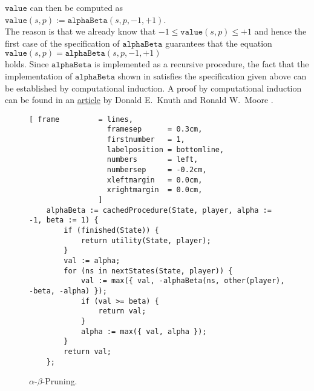 $\texttt{value}$ can then be computed as 
\\[0.2cm]
\hspace*{1.3cm}
$\texttt{value}(s, p ) := \texttt{alphaBeta}(s, p, -1, +1)$.
\\[0.2cm]
The reason is that we already know that $-1 \leq \texttt{value}(s,p) \leq +1$ and hence the first case of the
specification of $\texttt{alphaBeta}$ guarantees that the equation
\\[0.2cm]
\hspace*{1.3cm}
$\texttt{value}(s,p) = \texttt{alphaBeta}(s,p,-1,+1)$
\\[0.2cm]
holds.  Since $\texttt{alphaBeta}$ is implemented as a recursive procedure, 
the fact that the implementation of $\texttt{alphaBeta}$ shown in  satisfies the
specification given above can be established by computational induction.  A proof by computational induction
can be found in an
\href{https://pdfs.semanticscholar.org/dce2/6118156e5bc287bca2465a62e75af39c7e85.pdf}{article} by Donald
E.~Knuth and Ronald W.~Moore \cite{knuth:1975}. 



\begin{figure}[!ht]
\centering
\begin{Verbatim}[ frame         = lines, 
                  framesep      = 0.3cm, 
                  firstnumber   = 1,
                  labelposition = bottomline,
                  numbers       = left,
                  numbersep     = -0.2cm,
                  xleftmargin   = 0.0cm,
                  xrightmargin  = 0.0cm,
                ]
    alphaBeta := cachedProcedure(State, player, alpha := -1, beta := 1) {
        if (finished(State)) {
            return utility(State, player);
        }
        val := alpha;
        for (ns in nextStates(State, player)) {
            val := max({ val, -alphaBeta(ns, other(player), -beta, -alpha) });
            if (val >= beta) {
                return val;
            }
            alpha := max({ val, alpha });
        }
        return val;
    };
\end{Verbatim}
\vspace*{-0.3cm}
\caption{$\alpha$-$\beta$-Pruning.}
\label{fig:game-alpha-beta.stlx}
\end{figure}

